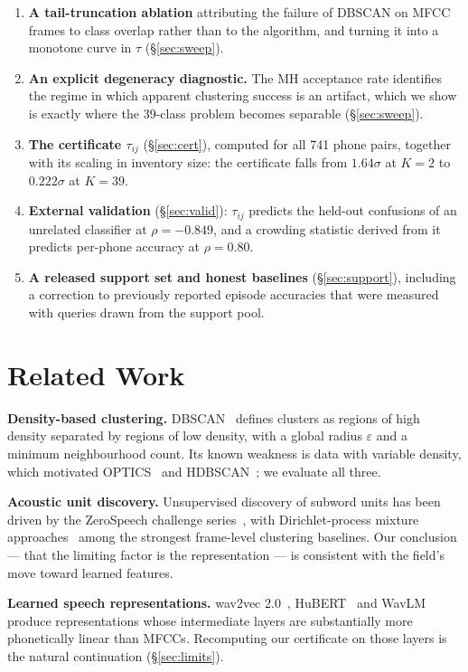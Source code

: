 \documentclass[11pt]{article}
\begin{document}
\begin{enumerate}
\item \textbf{A tail-truncation ablation} attributing the failure of DBSCAN on
MFCC frames to class overlap rather than to the algorithm, and turning it into a
monotone curve in $\tau$ (\S\ref{sec:sweep}).
\item \textbf{An explicit degeneracy diagnostic.} The MH acceptance rate
identifies the regime in which apparent clustering success is an artifact,
which we show is exactly where the 39-class problem becomes separable
(\S\ref{sec:sweep}).
\item \textbf{The certificate $\tau_{ij}$} (\S\ref{sec:cert}), computed for all
741 phone pairs, together with its scaling in inventory size: the certificate
falls from $1.64\sigma$ at $K=2$ to $0.222\sigma$ at $K=39$.
\item \textbf{External validation} (\S\ref{sec:valid}): $\tau_{ij}$ predicts the
held-out confusions of an unrelated classifier at $\rho = -0.849$, and a
crowding statistic derived from it predicts per-phone accuracy at
$\rho = 0.80$.
\item \textbf{A released support set and honest baselines}
(\S\ref{sec:support}), including a correction to previously reported episode
accuracies that were measured with queries drawn from the support pool.
\end{enumerate}

\section{Related Work}

\textbf{Density-based clustering.} DBSCAN~\cite{ester1996} defines clusters as
regions of high density separated by regions of low density, with a global
radius $\varepsilon$ and a minimum neighbourhood count. Its known weakness is
data with variable density, which motivated OPTICS~\cite{ankerst1999} and
HDBSCAN~\cite{campello2013}; we evaluate all three.

\textbf{Acoustic unit discovery.} Unsupervised discovery of subword units has
been driven by the ZeroSpeech challenge series~\cite{versteegh2015}, with
Dirichlet-process mixture approaches~\cite{lee2012} among the strongest
frame-level clustering baselines. Our conclusion --- that the limiting factor is
the representation --- is consistent with the field's move toward learned
features.

\textbf{Learned speech representations.} wav2vec 2.0~\cite{baevski2020},
HuBERT~\cite{hsu2021} and WavLM~\cite{chen2022} produce representations whose
intermediate layers are substantially more phonetically linear than MFCCs.
Recomputing our certificate on those layers is the natural continuation
(\S\ref{sec:limits}).
\end{document}
